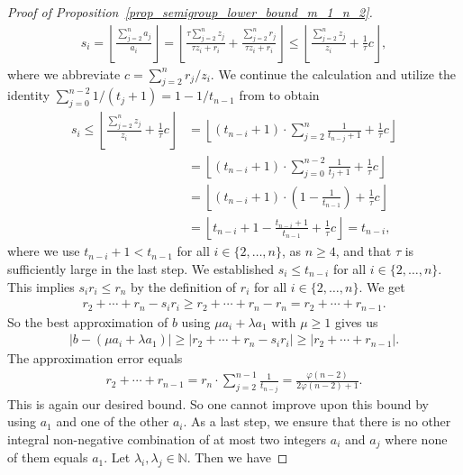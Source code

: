 \documentclass[pdflatex]{sn-jnl}
\newcommand{\N}{\mathbb{N}}
\theoremstyle{thmstyleone}%
\theoremstyle{thmstyletwo}%
\theoremstyle{thmstylethree}%
\begin{document}
\begin{proof}[Proof of Proposition~\ref{prop_semigroup_lower_bound_m_1_n_2}]
\begin{align*}
			s_i = \left\lfloor \frac{\sum_{j=2}^n a_j}{a_i}\right\rfloor = \left\lfloor \frac{\tau \sum_{j=2}^n z_j}{\tau z_i + r_i} + \frac{\sum_{j=2}^nr_j}{\tau z_i + r_i}\right\rfloor \leq \left\lfloor \frac{\sum_{j=2}^n z_j}{z_i} + \frac{1}{\tau}c\right\rfloor,
		\end{align*}
		where we abbreviate $c = \sum_{j=2}^n r_j/z_i$. We continue the calculation and utilize the identity $\sum_{j=0}^{n-2}1/(t_{j} + 1) = 1 - 1/t_{n-1}$ from \cite{sylvestersequence1880sylvester} to obtain 
		\begin{align*}
			s_i \leq \left\lfloor \frac{\sum_{j=2}^n z_j}{z_i} + \frac{1}{\tau}c\right\rfloor &= \left\lfloor (t_{n-i} + 1)\cdot\sum_{j=2}^{n}\frac{1}{t_{n-j} + 1} + \frac{1}{\tau}c\right\rfloor \\
			& = \left\lfloor (t_{n-i} + 1)\cdot\sum_{j=0}^{n-2}\frac{1}{t_{j} + 1} + \frac{1}{\tau}c\right\rfloor \\
			& = \left\lfloor (t_{n-i} + 1)\cdot\left(1-\frac{1}{t_{n-1}}\right) + \frac{1}{\tau}c\right\rfloor \\
			& = \left\lfloor t_{n-i} + 1 - \frac{t_{n-i} + 1}{t_{n - 1}} + \frac{1}{\tau}c\right\rfloor = t_{n-i},
		\end{align*}
		where we use $t_{n-i} + 1 < t_{n-1}$ for all $i\in\lbrace 2,\ldots,n\rbrace$, as $n\geq 4$, and that $\tau$ is sufficiently large in the last step. We established $s_i\leq t_{n-i}$ for all $i\in\lbrace 2,\ldots,n\rbrace$. This implies $s_ir_i\leq r_n$ by the definition of $r_i$ for all $i\in\lbrace 2,\ldots,n\rbrace$. 
		We get 
		\begin{align*}
			r_2 + \cdots + r_n - s_ir_i \geq r_2 + \cdots + r_n - r_n = r_2 + \cdots + r_{n-1}.
		\end{align*}
		So the best approximation of $b$ using $\mu a_i + \lambda a_1$ with $\mu\geq 1$ gives us
		\begin{align*}
			\left| b - (\mu a_i + \lambda a_1)\right| \geq \left| r_2 + \cdots + r_n - s_ir_i\right|\geq \left| r_2 + \cdots + r_{n-1}\right|.
		\end{align*}
		The approximation error equals
		\begin{align*}
			r_2 + \cdots + r_{n-1} = r_n \cdot \sum_{j = 2}^{n-1} \frac{1}{t_{n-j}} = \frac{\varphi(n-2)}{2\varphi(n-2) + 1}.
		\end{align*}
		This is again our desired bound. So one cannot improve upon this bound by using $a_1$ and one of the other $a_i$. As a last step, we ensure that there is no other integral non-negative combination of at most two integers $a_i$ and $a_j$ where none of them equals $a_1$. Let $\lambda_i,\lambda_j\in \N$. Then we have

\end{proof}
\end{document}
